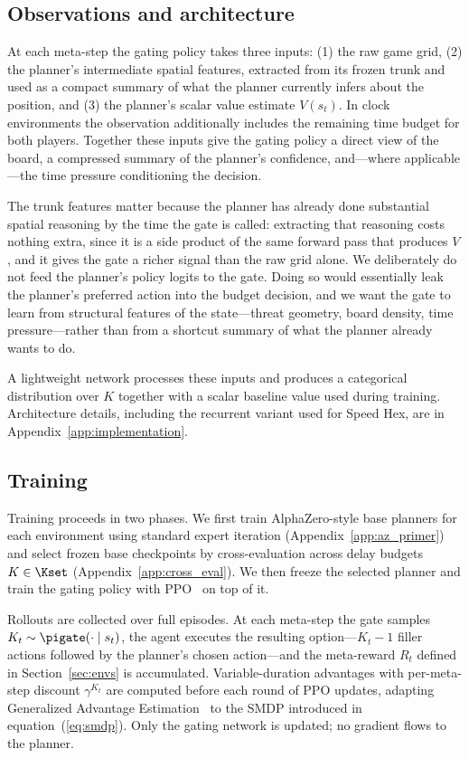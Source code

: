 \subsection{Observations and architecture}

At each meta-step the gating policy takes three inputs: (1) the raw
game grid, (2) the planner's intermediate spatial features, extracted
from its frozen trunk and used as a compact summary of what the planner
currently infers about the position, and (3) the planner's scalar value
estimate $V(s_t)$.
In clock environments the observation additionally includes the
remaining time budget for both players.
Together these inputs give the gating policy a direct view of the
board, a compressed summary of the planner's confidence, and---where
applicable---the time pressure conditioning the decision.

The trunk features matter because the planner has already done
substantial spatial reasoning by the time the gate is called: extracting
that reasoning costs nothing extra, since it is a side product of the
same forward pass that produces $V$, and it gives the gate a richer
signal than the raw grid alone.
We deliberately do not feed the planner's policy logits to the gate.
Doing so would essentially leak the planner's preferred action into the
budget decision, and we want the gate to learn from structural features
of the state---threat geometry, board density, time pressure---rather
than from a shortcut summary of what the planner already wants to do.

A lightweight network processes these inputs and produces a categorical
distribution over $K$ together with a scalar baseline value used during
training.
Architecture details, including the recurrent variant used for Speed
Hex, are in Appendix~\ref{app:implementation}.

\subsection{Training}

Training proceeds in two phases.
We first train AlphaZero-style base planners for each environment using
standard expert iteration (Appendix~\ref{app:az_primer}) and select
frozen base checkpoints by cross-evaluation across delay budgets
$K \in \Kset$ (Appendix~\ref{app:cross_eval}).
We then freeze the selected planner and train the gating policy with
PPO~\citep{schulman2017proximal} on top of it.

Rollouts are collected over full episodes.
At each meta-step the gate samples $K_t \sim \pigate(\cdot \mid s_t)$,
the agent executes the resulting option---$K_t{-}1$ filler actions
followed by the planner's chosen action---and the meta-reward $R_t$
defined in Section~\ref{sec:envs} is accumulated.
Variable-duration advantages with per-meta-step discount $\gamma^{K_t}$
are computed before each round of PPO updates, adapting Generalized
Advantage Estimation~\citep{schulman2015high} to the SMDP introduced in
equation~(\ref{eq:smdp}).
Only the gating network is updated; no gradient flows to the planner.

